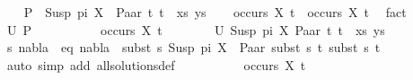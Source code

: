 \begin{isabellebody}
\ \ \isamarkupfalse%
\ {\isacharquery}{\kern0pt}P\ {\isacharequal}{\kern0pt}\ {\isachardoublequoteopen}{\isacharparenleft}{\kern0pt}Susp\ pi\ X\ {\isasymapprox}{\isacharquery}{\kern0pt}\ Paar\ t{}\ t{}\ {\isacharhash}{\kern0pt}\ xs{\isacharcomma}{\kern0pt}\ ys{\isacharparenright}{\kern0pt}{\isachardoublequoteclose}\isanewline
\ \ \isamarkupfalse%
\ {\isachardoublequoteopen}occurs\ X\ t{}\ {\isasymor}\ occurs\ X\ t{}{\isachardoublequoteclose}\ \isamarkupfalse%
\ fact\isanewline
\ \ \isamarkupfalse%
\ \isamarkupfalse%
\ {\isachardoublequoteopen}U\ {\isacharquery}{\kern0pt}P\ {\isacharequal}{\kern0pt}\ {\isacharbraceleft}{\kern0pt}{\isacharbraceright}{\kern0pt}{\isachardoublequoteclose}\isanewline
\ \ \isamarkupfalse%
\isanewline
\ \ \ \ \isakeywordONE{{\isacharbraceleft}{\kern0pt}}\isamarkupfalse%
\isamarkupfalse%
\ {\isachardoublequoteopen}occurs\ X\ t{}{\isachardoublequoteclose}\isanewline
\ \ \ \ \ \ \isakeywordONE{{\isacharbraceleft}{\kern0pt}}\isamarkupfalse%
\isamarkupfalse%
\ {\isachardoublequoteopen}U\ {\isacharparenleft}{\kern0pt}{\isacharparenleft}{\kern0pt}Susp\ pi\ X{\isacharcomma}{\kern0pt}\ Paar\ t{}\ t{}{\isacharparenright}{\kern0pt}\ {\isacharhash}{\kern0pt}\ xs{\isacharcomma}{\kern0pt}\ ys{\isacharparenright}{\kern0pt}\ {\isasymnoteq}\ {\isacharbraceleft}{\kern0pt}{\isacharbraceright}{\kern0pt}{\isachardoublequoteclose}\isanewline
\ \ \ \ \isamarkupfalse%
\ \isamarkupfalse%
\ s\ nabla\ \ eq{}{\isacharcolon}{\kern0pt}\ {\isachardoublequoteopen}nabla\ {\isasymturnstile}\ subst\ s\ {\isacharparenleft}{\kern0pt}Susp\ pi\ X{\isacharparenright}{\kern0pt}\ {\isasymapprox}\ Paar\ {\isacharparenleft}{\kern0pt}subst\ s\ t{}{\isacharparenright}{\kern0pt}\ {\isacharparenleft}{\kern0pt}subst\ s\ t{}{\isacharparenright}{\kern0pt}{\isachardoublequoteclose}\isanewline
\ \ \ \ \ \ \isamarkupfalse%
\ {\isacharparenleft}{\kern0pt}auto\ simp\ add{\isacharcolon}{\kern0pt}\ all{\isacharunderscore}{\kern0pt}solutions{\isacharunderscore}{\kern0pt}def{\isacharparenright}{\kern0pt}\isanewline
\ \ \ \ \isamarkupfalse%
\isanewline
\ \ \ \ \isamarkupfalse%
\ {\isachardoublequoteopen}occurs\ X\ t{}{\isachardoublequoteclose}\ \isamarkupfalse%

\end{isabellebody}
